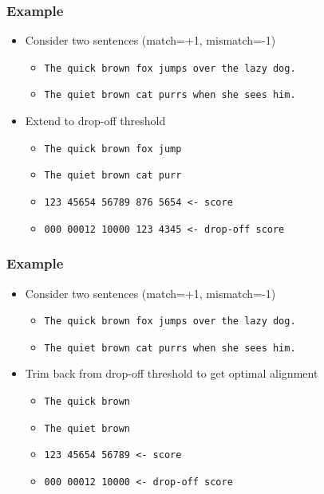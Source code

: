\begin{frame}
  \frametitle{Example}
  \begin{itemize}
    \item Consider two sentences (match=+1, mismatch=-1)
    \begin{itemize}
      \item \texttt{The quick brown fox jumps over the lazy dog.}
      \item \texttt{The quiet brown cat purrs when she sees him.}
    \end{itemize}
    \item Extend to drop-off threshold
    \begin{itemize}
      \item \texttt{The quick brown fox jump}
      \item \texttt{The quiet brown cat purr}
      \item \texttt{123 45654 56789 876 5654 <- score}
      \item \texttt{000 00012 10000 123 4345 <- drop-off score}        
    \end{itemize}
  \end{itemize}
\end{frame}

\begin{frame}
  \frametitle{Example}
  \begin{itemize}
    \item Consider two sentences (match=+1, mismatch=-1)
    \begin{itemize}
      \item \texttt{The quick brown fox jumps over the lazy dog.}
      \item \texttt{The quiet brown cat purrs when she sees him.}
    \end{itemize}
    \item Trim back from drop-off threshold to get optimal alignment
    \begin{itemize}
      \item \texttt{The quick brown}
      \item \texttt{The quiet brown}
      \item \texttt{123 45654 56789 <- score}
      \item \texttt{000 00012 10000 <- drop-off score}        
    \end{itemize}
  \end{itemize}
\end{frame}

